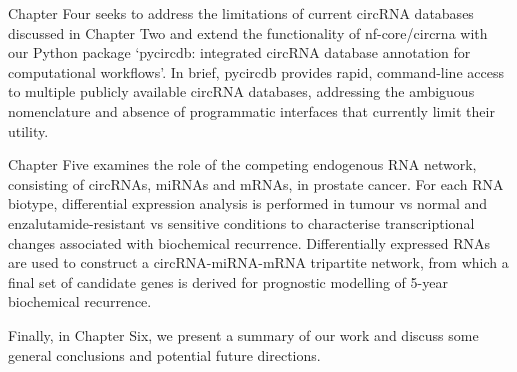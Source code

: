 Chapter Four seeks to address the limitations of current circRNA databases discussed in Chapter Two and extend the functionality of nf-core/circrna with our Python package `pycircdb: integrated circRNA database annotation for computational workflows'. In brief, pycircdb provides rapid, command-line access to multiple publicly available circRNA databases, addressing the ambiguous nomenclature and absence of programmatic interfaces that currently limit their utility. 

Chapter Five examines the role of the competing endogenous RNA network, consisting of circRNAs, miRNAs and mRNAs, in prostate cancer. For each RNA biotype, differential expression analysis is performed in tumour vs normal and enzalutamide-resistant vs sensitive conditions to characterise transcriptional changes associated with biochemical recurrence. Differentially expressed RNAs are used to construct a circRNA-miRNA-mRNA tripartite network, from which a final set of candidate genes is derived for prognostic modelling of 5-year biochemical recurrence.

Finally, in Chapter Six, we present a summary of our work and discuss some general conclusions and potential future directions. 


